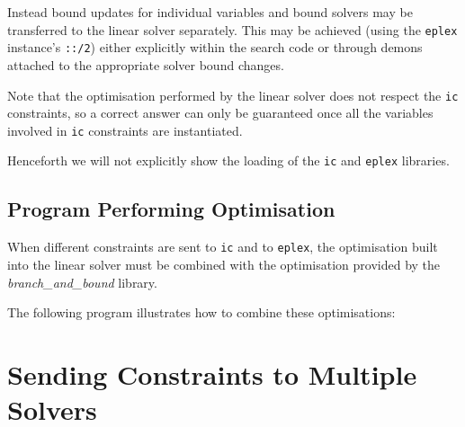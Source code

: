 Instead bound updates for individual variables and bound solvers may
be transferred to the linear solver separately. This may be achieved
(using the {\tt eplex} instance's {\tt ::/2}) either explicitly within
the search code or through demons attached to the appropriate solver
bound changes. 

Note that the optimisation performed by the linear
solver does not respect the {\tt ic} constraints, so a correct answer
can only be guaranteed once all the variables involved in {\tt ic}
constraints are instantiated.

Henceforth we will not explicitly show the loading of the {\tt ic} and
{\tt eplex} libraries.

\subsection{Program Performing Optimisation}
When different constraints are sent to {\tt ic} and to {\tt eplex},
the optimisation built into the linear solver must be combined with
the optimisation provided by the \eclipse{} {\em branch\_and\_bound}
library. 

The following program illustrates how to combine these optimisations:


\section{Sending Constraints to Multiple Solvers}

